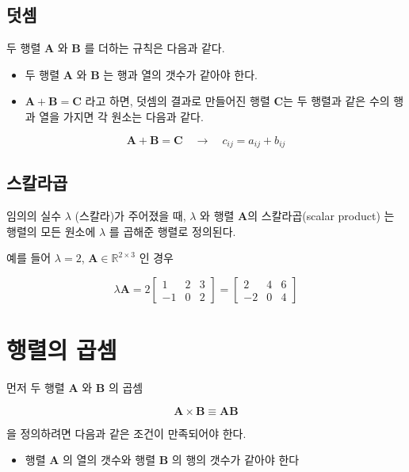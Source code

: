 \documentclass[
  11pt,
  a4paper,
  oneside]{scrbook}
\providecommand{\tightlist}{%
  \setlength{\itemsep}{0pt}\setlength{\parskip}{0pt}}\usepackage{longtable,booktabs,array}
\newcommand{\RR}{\mathbb{R}}
\theoremstyle{definition}
\theoremstyle{definition}
\theoremstyle{plain}
\theoremstyle{remark}
\begin{document}
\subsection{덧셈}\label{uxb367uxc148}

두 행렬 \(\pmb A\) 와 \(\pmb B\) 를 더하는 규칙은 다음과 같다.

\begin{itemize}
\tightlist
\item
  두 행렬 \(\pmb A\) 와 \(\pmb B\) 는 행과 열의 갯수가 같아야 한다.
\item
  \(\pmb A + \pmb B = \pmb C\) 라고 하면, 덧셈의 결과로 만들어진 행렬
  \(\pmb C\)는 두 행렬과 같은 수의 행과 열을 가지면 각 원소는 다음과
  같다.
\end{itemize}

\[ \pmb A + \pmb B = \pmb C \quad \rightarrow \quad c_{ij} = a_{ij} + b_{ij} \]

\subsection{스칼라곱}\label{uxc2a4uxce7cuxb77cuxacf1}

임의의 실수 \(\lambda\) (스칼라)가 주어졌을 때, \(\lambda\) 와 행렬
\(\pmb A\)의 스칼라곱(scalar product) 는 행렬의 모든 원소에 \(\lambda\)
를 곱해준 행렬로 정의된다.

예를 들어 \(\lambda=2\), \(\pmb A \in \RR^{2\times 3}\) 인 경우

\[
\lambda \pmb A = 
2
\begin{bmatrix}
1 & 2 & 3 \\
-1 & 0 & 2
\end{bmatrix}
=
\begin{bmatrix}
2 & 4 & 6 \\
-2 & 0 & 4
\end{bmatrix}
\]

\section{행렬의 곱셈}\label{uxd589uxb82cuxc758-uxacf1uxc148}

먼저 두 행렬 \(\pmb A\) 와 \(\pmb B\) 의 곱셈

\[ \pmb A \times \pmb B \equiv \pmb A \pmb B \]

을 정의하려면 다음과 같은 조건이 만족되어야 한다.

\begin{itemize}
\tightlist
\item
  행렬 \(\pmb A\) 의 열의 갯수와 행렬 \(\pmb B\) 의 행의 갯수가 같아야
  한다
\end{itemize}
\end{document}
